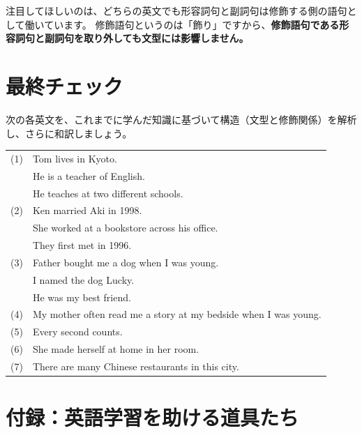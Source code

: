 \documentclass[12pt,titlepage]{jsarticle}
\begin{document}
  注目してほしいのは、どちらの英文でも形容詞句と副詞句は修飾する側の語句として働いています。
  修飾語句というのは「飾り」ですから、{\bf 修飾語句である形容詞句と副詞句を取り外しても文型には影響しません。}

  \newpage
  \section{最終チェック}
  次の各英文を、これまでに学んだ知識に基づいて構造（文型と修飾関係）を解析し、さらに和訳しましょう。
  \\
 \begin{table}[htbp]
    \begin{tabular}{ll}
     (1) & Tom lives in Kyoto. \\
     & He is a teacher of English. \\
     & He teaches at two different schools.\\
     (2) & Ken married Aki in 1998.\\
     & She worked at a bookstore across his office.\\
     & They first met in 1996.\\
     (3) & Father bought me a dog when I was young.\\
     & I named the dog Lucky.\\
     & He was my best friend.\\
     (4) & My mother often read me a story at my bedside when I was young.\\
     (5) & Every second counts.\\
     (6) & She made herself at home in her room.\\
     (7) & There are many Chinese restaurants in this city.\\
    \end{tabular}
 \end{table}


 \section{付録：英語学習を助ける道具たち}
\end{document}
